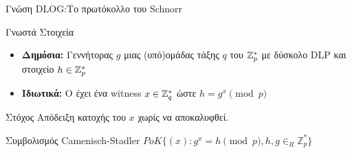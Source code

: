 \documentclass[handout]{beamer}
\begin{document}
\begin{frame}[allowframebreaks]{Γνώση DLOG:Το πρωτόκολλο του Schnorr}
\begin{block}{Γνωστά Στοιχεία}
\begin{itemize}
\item \textbf{Δημόσια:} Γεννήτορας $g$ μιας (υπό)ομάδας τάξης $q$ του $\mathbb{Z}^*_{p}$ με δύσκολο DLP και στοιχείο $h \in \mathbb{Z}^*_{p}$ 
\item \textbf{Ιδιωτικά:} O \prv έχει ένα witness $x \in \mathbb{Z}^*_{q}$ ώστε $h = g^x \pmod{p}$
\end{itemize}
\end{block}

\begin{block}{Στόχος}
Απόδειξη κατοχής του $x$ χωρίς να αποκαλυφθεί.
\end{block}

\begin{block}{Συμβολισμός Camenisch-Stadler}
$PoK \{(x): g^x = h \pmod{p}, h,g \in_R \mathbb{Z}_p^* \}$ 
\end{block}


\end{frame}
\end{document}
